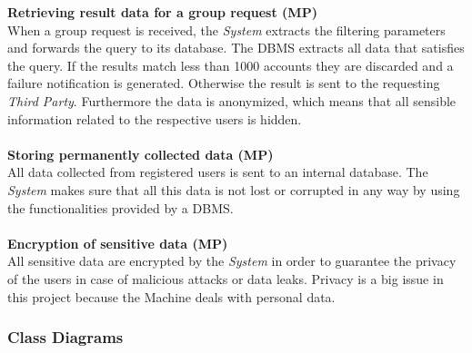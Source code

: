 \documentclass[titlepage]{article}
\begin{document}
{\bf Retrieving result data for a group request (MP)} \\
When a group request is received, the {\it System} extracts the filtering parameters and forwards the query to its database. The DBMS extracts all data that satisfies the query. If the results match less than 1000 accounts they are discarded and a failure notification is generated. Otherwise the result is sent to the requesting {\it Third Party}. Furthermore the data is anonymized, which means that all sensible information related to the respective users is hidden. \\ \\
{\bf Storing permanently collected data (MP)} \\
All data collected from registered users is sent to an internal database. The {\it System} makes sure that all this data is not lost or corrupted in any way by using the functionalities provided by a DBMS.\\ \\
{\bf Encryption of sensitive data (MP)} \\
All sensitive data are encrypted by the {\it System} in order to guarantee the privacy of the users in case of malicious attacks or data leaks. Privacy is a big issue in this project because the Machine deals with personal data.\\

		\subsubsection{Class Diagrams}
		
\end{document}
